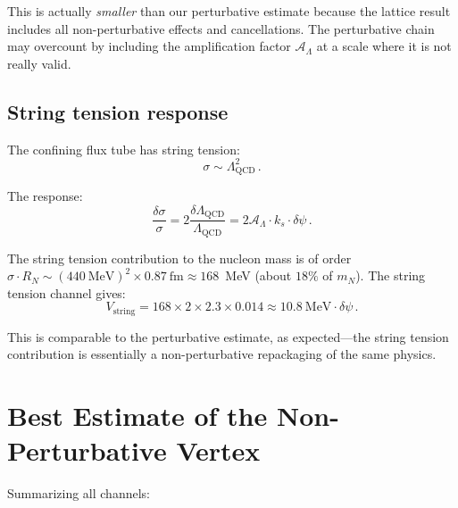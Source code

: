 \documentclass[aps,prd,twocolumn,superscriptaddress,floatfix,nofootinbib]{revtex4-2}
\newcommand{\LQCD}{\Lambda_{\mathrm{QCD}}}
\newcommand{\mN}{m_N}
\newcommand{\ks}{k_s}
\newcommand{\dpsi}{\delta\psi}
\begin{document}
This is actually \emph{smaller} than our perturbative estimate because the
lattice result includes all non-perturbative effects and cancellations. The
perturbative chain may overcount by including the amplification factor
$\mathcal{A}_\Lambda$ at a scale where it is not really valid.

\subsection{String tension response}\label{sec:string_tension}

The confining flux tube has string tension:
\begin{equation}
\sigma \sim \LQCD^2 \, .
\end{equation}

The response:
\begin{equation}
\frac{\delta\sigma}{\sigma} = 2 \frac{\delta\LQCD}{\LQCD}
= 2\mathcal{A}_\Lambda \cdot \ks \cdot \dpsi \, .
\label{eq:string_response}
\end{equation}

The string tension contribution to the nucleon mass is of order
$\sigma \cdot R_N \sim (440~\text{MeV})^2 \times 0.87~\text{fm} \approx
168$~MeV (about $18\%$ of $\mN$). The string tension channel gives:
\begin{equation}
V_{\mathrm{string}} = 168 \times 2 \times 2.3 \times 0.014
\approx 10.8~\text{MeV} \cdot \dpsi \, .
\label{eq:V_string}
\end{equation}

This is comparable to the perturbative estimate, as expected---the string
tension contribution is essentially a non-perturbative repackaging of the
same physics.


\section{Best Estimate of the Non-Perturbative Vertex}\label{sec:best_nonpert}

Summarizing all channels:
\end{document}
